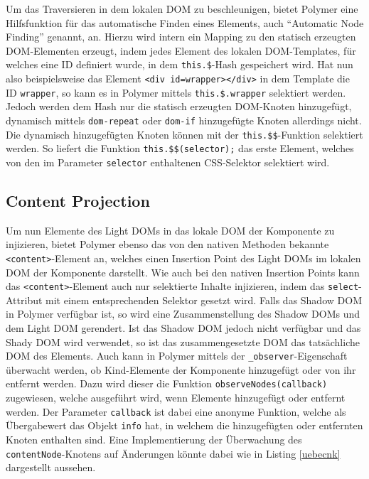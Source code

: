 Um das Traversieren in dem lokalen \ac{DOM} zu beschleunigen, bietet Polymer eine Hilfsfunktion für das automatische Finden eines Elements, auch ``Automatic Node Finding'' genannt, an. Hierzu wird intern ein Mapping zu den statisch erzeugten \ac{DOM}-Elementen erzeugt, indem jedes Element des lokalen \ac{DOM}-Templates, für welches eine ID definiert wurde, in dem \texttt{this.\$}-Hash gespeichert wird. Hat nun also beispielsweise das Element \texttt{\textless{}div\ id=\dq wrapper\dq\textgreater{}\textless{}/div\textgreater{}} in dem Template die ID \texttt{wrapper}, so kann es in Polymer mittels \texttt{this.\$.wrapper} selektiert werden. Jedoch werden dem Hash nur die statisch erzeugten \ac{DOM}-Knoten hinzugefügt, dynamisch mittels \texttt{dom-repeat} oder \texttt{dom-if} hinzugefügte Knoten allerdings nicht. Die dynamisch hinzugefügten Knoten können mit der \texttt{this.\$\$}-Funktion selektiert werden. So liefert die Funktion \texttt{this.\$\$(selector);} das erste Element, welches von den im Parameter \texttt{selector} enthaltenen \ac{CSS}-Selektor selektiert wird.


\subsection{Content Projection}\label{polymer-content-projection}

Um nun Elemente des Light \ac{DOM}s in das lokale \ac{DOM} der Komponente zu injizieren, bietet Polymer ebenso das von den nativen Methoden bekannte \texttt{\textless{}content\textgreater{}}-Element an, welches einen Insertion Point des Light \ac{DOM}s im lokalen \ac{DOM} der Komponente darstellt. Wie auch bei den nativen Insertion Points kann das \texttt{\textless{}content\textgreater{}}-Element auch nur selektierte Inhalte injizieren, indem das \texttt{select}-Attribut mit einem entsprechenden Selektor gesetzt wird. Falls das Shadow \ac{DOM} in Polymer verfügbar ist, so wird eine Zusammenstellung des Shadow \ac{DOM}s und dem Light \ac{DOM} gerendert. Ist das Shadow \ac{DOM} jedoch nicht verfügbar und das Shady \ac{DOM} wird verwendet, so ist das zusammengesetzte \ac{DOM} das tatsächliche \ac{DOM} des Elements. Auch kann in Polymer mittels der \texttt{\_observer}-Eigenschaft überwacht werden, ob Kind-Elemente der Komponente hinzugefügt oder von ihr entfernt werden. Dazu wird dieser die Funktion \texttt{observeNodes(callback)} zugewiesen, welche ausgeführt wird, wenn Elemente hinzugefügt oder entfernt werden. Der Parameter \texttt{callback} ist dabei eine anonyme Funktion, welche als Übergabewert das Objekt \texttt{info} hat, in welchem die hinzugefügten oder entfernten Knoten enthalten sind. Eine Implementierung der Überwachung des \texttt{contentNode}-Knotens auf Änderungen könnte dabei wie in Listing \ref{uebecnk} dargestellt aussehen.

